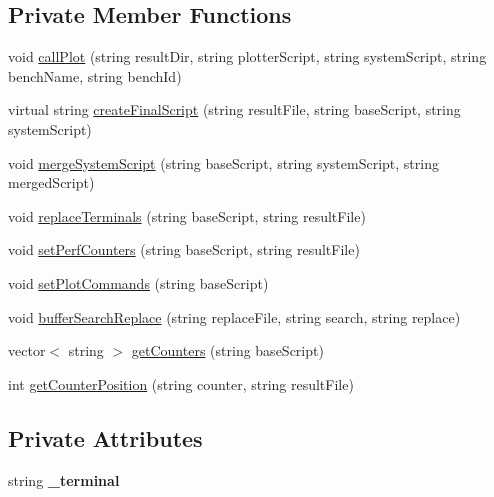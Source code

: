 \subsection*{Private Member Functions}
\begin{DoxyCompactItemize}
\item 
void \hyperlink{classPlotterGnuplot_aa88b47c1b5892759768d504cae3d2ac9}{call\-Plot} (string result\-Dir, string plotter\-Script, string system\-Script, string bench\-Name, string bench\-Id)
\item 
virtual string \hyperlink{classPlotterGnuplot_adf119493dce04bb055ca1ba68e32051d}{create\-Final\-Script} (string result\-File, string base\-Script, string system\-Script)
\item 
void \hyperlink{classPlotterGnuplot_ab6d0554e136f7b1cf521879e516b2804}{merge\-System\-Script} (string base\-Script, string system\-Script, string merged\-Script)
\item 
void \hyperlink{classPlotterGnuplot_afec70b9d1762320e5bf77c2182a4d86f}{replace\-Terminals} (string base\-Script, string result\-File)
\item 
void \hyperlink{classPlotterGnuplot_a5ba453bf95e6fe4518d8de9afa9468f3}{set\-Perf\-Counters} (string base\-Script, string result\-File)
\item 
void \hyperlink{classPlotterGnuplot_a2807840ac514a1f2a35586b0341f391d}{set\-Plot\-Commands} (string base\-Script)
\item 
void \hyperlink{classPlotterGnuplot_ac295485a9fdeed84389b0976c6c092ec}{buffer\-Search\-Replace} (string replace\-File, string search, string replace)
\item 
vector$<$ string $>$ \hyperlink{classPlotterGnuplot_a1f6d90f20d97cc9394632fdbdd52037c}{get\-Counters} (string base\-Script)
\item 
int \hyperlink{classPlotterGnuplot_a9dafadb70a619802aee17fda4a08de0e}{get\-Counter\-Position} (string counter, string result\-File)
\end{DoxyCompactItemize}
\subsection*{Private Attributes}
\begin{DoxyCompactItemize}
\item 
\hypertarget{classPlotterGnuplot_a0f4686259c2b730cbd45ec13ee712dc6}{string {\bfseries \-\_\-terminal}}\label{classPlotterGnuplot_a0f4686259c2b730cbd45ec13ee712dc6}

\end{DoxyCompactItemize}
